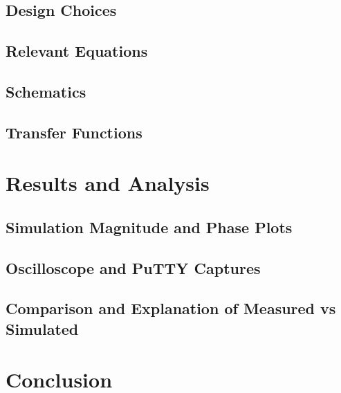 \documentclass[conference]{IEEEtran}
\begin{document}
    \subsection{Design Choices}
    \subsection{Relevant Equations}
    \subsection{Schematics}
    \subsection{Transfer Functions}

\section{Results and Analysis}
    \subsection{Simulation Magnitude and Phase Plots}
    \subsection{Oscilloscope and PuTTY Captures}
    \subsection{Comparison and Explanation of Measured vs Simulated}

\section{Conclusion}
\end{document}
